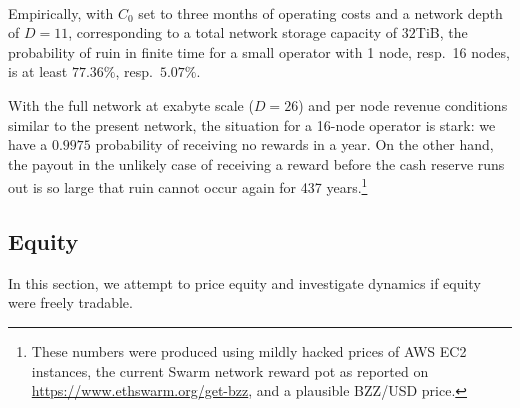 \

Empirically, with $C_0$ set to three months of operating costs and a network depth of $D=11$, corresponding to a total network storage capacity of $32$TiB, the probability of ruin in finite time for a small operator with 1 node, resp.~16 nodes, is at least $77.36\%$, resp.~$5.07\%$.
    
With the full network at exabyte scale ($D=26$) and per node revenue conditions similar to the present network, the situation for a 16-node operator is stark: we have a $0.9975$ probability of receiving no rewards in a year.
%
On the other hand, the payout in the unlikely case of receiving a reward before the cash reserve runs out is so large that ruin cannot occur again for 437 years.\footnote{These numbers were produced using mildly hacked prices of AWS EC2 instances, the current Swarm network reward pot as reported on \url{https://www.ethswarm.org/get-bzz}, and a plausible BZZ/USD price.}

\subsection{Equity}

In this section, we attempt to price equity and investigate dynamics if equity were freely tradable.

